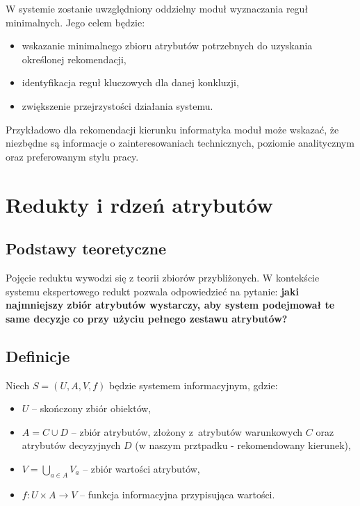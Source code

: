 \documentclass[12pt,a4paper,oneside]{article}
\begin{document}
W systemie zostanie uwzględniony oddzielny moduł wyznaczania reguł minimalnych. Jego celem będzie:
\begin{itemize}[leftmargin=1.2cm]
    \item wskazanie minimalnego zbioru atrybutów potrzebnych do uzyskania określonej rekomendacji,
    \item identyfikacja reguł kluczowych dla danej konkluzji,
    \item zwiększenie przejrzystości działania systemu.
\end{itemize}

Przykładowo dla rekomendacji kierunku informatyka moduł może wskazać, że niezbędne są informacje o zainteresowaniach technicznych, poziomie analitycznym oraz preferowanym stylu pracy.

\section{Redukty i rdzeń atrybutów}

\subsection{Podstawy teoretyczne}

Pojęcie reduktu wywodzi się z teorii zbiorów przybliżonych. W kontekście systemu ekspertowego redukt pozwala odpowiedzieć na pytanie: \textbf{jaki najmniejszy zbiór atrybutów wystarczy, aby system podejmował te same decyzje co przy użyciu pełnego zestawu atrybutów?}

\subsection{Definicje}

Niech $S = (U, A, V, f)$ będzie systemem informacyjnym, gdzie:
\begin{itemize}
    \item $U$ -- skończony zbiór obiektów,
    \item $A = C \cup D$ -- zbiór atrybutów, złożony z~atrybutów warunkowych $C$ oraz atrybutów decyzyjnych $D$ (w naszym prztpadku - rekomendowany kierunek),
    \item $V = \bigcup_{a \in A} V_a$ -- zbiór wartości atrybutów,
    \item $f: U \times A \to V$ -- funkcja informacyjna przypisująca wartości.
\end{itemize}
\end{document}
